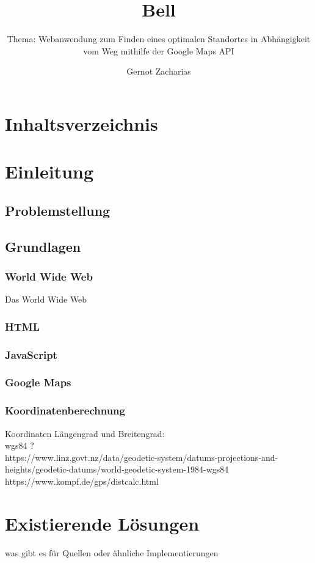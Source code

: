 \documentclass[a4paper, twoside, 12pt]{scrreprt}
\title{Bell}
\author{Gernot Zacharias}
\subtitle{Thema: Webanwendung zum Finden eines optimalen Standortes in Abhängigkeit vom Weg mithilfe der Google Maps API}
\begin{document}
\maketitle
\cleardoublepage
\chapter {Inhaltsverzeichnis}

\setcounter{page}{1}
\chapter {Einleitung}

\section {Problemstellung}

\section{Grundlagen}
\subsection{World Wide Web}
Das World Wide Web~\citep{www}
\subsection{HTML}
\subsection{JavaScript}
\subsection{Google Maps}
\subsection{Koordinatenberechnung}
Koordinaten Längengrad und Breitengrad:\\ wgs84 ? \\
https://www.linz.govt.nz/data/geodetic-system/datums-projections-and-heights/geodetic-datums/world-geodetic-system-1984-wgs84 \\
https://www.kompf.de/gps/distcalc.html
\chapter{Existierende Lösungen}
was gibt es für Quellen oder ähnliche Implementierungen
\end{document}
